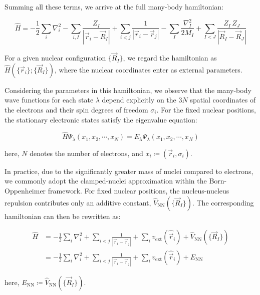 Summing all these terms, we arrive at the full many-body hamiltonian:

\begin{equation}
    \hat{H}=-\frac{1}{2}\sum_i\nabla_i^2
    -\sum_{i,I}\frac{Z_I}{|\vec{r}_i-\vec{R}_I|}
    +\sum_{i<j}\frac{1}{|\vec{r}_i-\vec{r}_j|}
    -\sum_I\frac{\nabla_I^2}{2M_I}
    +\sum_{I<J}\frac{Z_I\,Z_J}{|\vec{R}_I-\vec{R}_J|}    
\label{full_many-body_hamiltonian}
\end{equation}

For a given nuclear configuration $\{\vec{R}_I\}$, we regard the hamiltonian as $\hat{H}(\{\vec{r}_i\};\{\vec{R}_I\})$, where the nuclear coordinates enter as external parameters.

Considering the parameters in this hamiltonian, we observe that the many-body wave functions for each state $\lambda$ depend explicitly on the $3N$ spatial coordinates of the electrons and their spin degrees of freedom $\sigma_i$.
For the fixed nuclear positions, the stationary electronic states satisfy the eigenvalue equation:

\begin{equation}
    \hat{H}\Psi_\lambda(x_1,x_2,\cdots,x_N)
    = E_\lambda\Psi_\lambda(x_1,x_2,\cdots,x_N)
\label{many-body_hamiltonian_argument}
\end{equation}

here, $N$ denotes the number of electrons, and $x_i\coloneqq(\vec{r}_i,\sigma_i)$.

In practice, due to the significantly greater mass of nuclei compared to electrons, we commonly adopt the clamped-nuclei approximation within the Born-Oppenheimer framework.
For fixed nuclear positions, the nucleus-nucleus repulsion contributes only an additive constant, $\hat{V}_\mathrm{NN}(\{\vec{R}_I\})$.
The corresponding hamiltonian can then be rewritten as:

\begin{equation}
\begin{aligned}
\hat{H}
    &=-\frac{1}{2}\sum_i\nabla_i^2
    +\sum_{i<j}\frac{1}{|\vec{r}_i-\vec{r}_j|}
    +\sum_i v_\mathrm{ext}(\hat{\vec{r}}_i)+\hat{V}_\mathrm{NN}(\{\vec{R}_I\}) \\
    &=-\frac{1}{2}\sum_i\nabla_i^2
    +\sum_{i<j}\frac{1}{|\vec{r}_i-\vec{r}_j|}
    +\sum_i v_\mathrm{ext}(\hat{\vec{r}}_i)+E_\mathrm{NN}
\end{aligned}
\label{clamped_nuclei_many_body_hamiltonian}
\end{equation}

here, $E_\mathrm{NN}\coloneqq \hat{V}_\mathrm{NN}(\{\vec{R}_I\})$.

